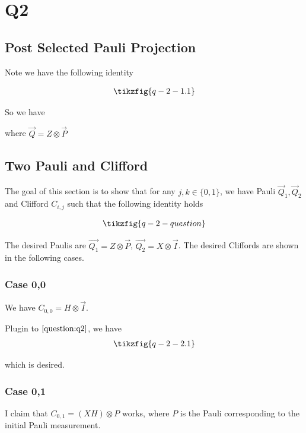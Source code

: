 \section{Q2}

\subsection{Post Selected Pauli Projection}

Note we have the following identity

\begin{align*}
	\tikzfig{q-2-1.1} 
\end{align*}

So we have 

where $\vec{Q} = Z \otimes \vec{P}$


\subsection{Two Pauli and Clifford}

The goal of this section is to show that for any $j, k \in \{0, 1\}$, we have Pauli $\vec{Q}_1, \vec{Q}_2$ and Clifford $C_{i, j}$ such that the following identity holds 

\begin{equation}\label{question:q2}
	\tikzfig{q-2-question}
\end{equation}

The desired Paulis are $\vec{Q_1} = Z \otimes \vec{P}$, $\vec{Q_2} = X \otimes \vec{I}$.
The desired Cliffords are shown in the following cases.

\subsubsection{Case 0,0}
We have
$C_{0,0} = H \otimes \vec{I}$.

Plugin to $\eqref{question:q2}$, we have
\begin{align*}
	\tikzfig{q-2-2.1}
\end{align*}
 
which is desired.

\subsubsection{Case 0,1}

I claim that $C_{0,1} = (X H) \otimes P$ works, where $P$ is the Pauli corresponding to the initial Pauli measurement.

